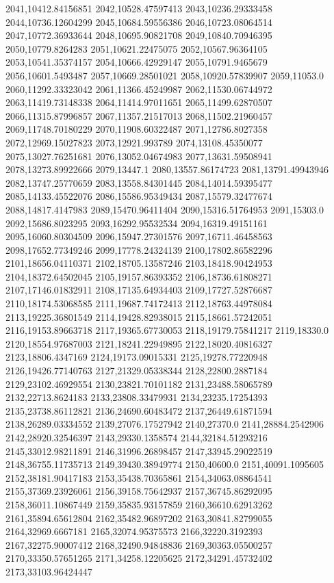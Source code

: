 2041,10412.84156851
2042,10528.47597413
2043,10236.29333458
2044,10736.12604299
2045,10684.59556386
2046,10723.08064514
2047,10772.36933644
2048,10695.90821708
2049,10840.70946395
2050,10779.8264283
2051,10621.22475075
2052,10567.96364105
2053,10541.35374157
2054,10666.42929147
2055,10791.9465679
2056,10601.5493487
2057,10669.28501021
2058,10920.57839907
2059,11053.0
2060,11292.33323042
2061,11366.45249987
2062,11530.06744972
2063,11419.73148338
2064,11414.97011651
2065,11499.62870507
2066,11315.87996857
2067,11357.21517013
2068,11502.21960457
2069,11748.70180229
2070,11908.60322487
2071,12786.8027358
2072,12969.15027823
2073,12921.993789
2074,13108.45350077
2075,13027.76251681
2076,13052.04674983
2077,13631.59508941
2078,13273.89922666
2079,13447.1
2080,13557.86174723
2081,13791.49943946
2082,13747.25770659
2083,13558.84301445
2084,14014.59395477
2085,14133.45522076
2086,15586.95349434
2087,15579.32477674
2088,14817.4147983
2089,15470.96411404
2090,15316.51764953
2091,15303.0
2092,15686.8023295
2093,16292.95532534
2094,16319.49151161
2095,16060.80304509
2096,15947.27301576
2097,16711.46458563
2098,17652.77349246
2099,17778.24324139
2100,17802.86582296
2101,18656.04110371
2102,18705.13587246
2103,18418.90424953
2104,18372.64502045
2105,19157.86393352
2106,18736.61808271
2107,17146.01832911
2108,17135.64934403
2109,17727.52876687
2110,18174.53068585
2111,19687.74172413
2112,18763.44978084
2113,19225.36801549
2114,19428.82938015
2115,18661.57242051
2116,19153.89663718
2117,19365.67730053
2118,19179.75841217
2119,18330.0
2120,18554.97687003
2121,18241.22949895
2122,18020.40816327
2123,18806.4347169
2124,19173.09015331
2125,19278.77220948
2126,19426.77140763
2127,21329.05338344
2128,22800.2887184
2129,23102.46929554
2130,23821.70101182
2131,23488.58065789
2132,22713.8624183
2133,23808.33479931
2134,23235.17254393
2135,23738.86112821
2136,24690.60483472
2137,26449.61871594
2138,26289.03334552
2139,27076.17527942
2140,27370.0
2141,28884.2542906
2142,28920.32546397
2143,29330.1358574
2144,32184.51293216
2145,33012.98211891
2146,31996.26898457
2147,33945.29022519
2148,36755.11735713
2149,39430.38949774
2150,40600.0
2151,40091.1095605
2152,38181.90417183
2153,35438.70365861
2154,34063.08864541
2155,37369.23926061
2156,39158.75642937
2157,36745.86292095
2158,36011.10867449
2159,35835.93157859
2160,36610.62913262
2161,35894.65612804
2162,35482.96897202
2163,30841.82799055
2164,32969.6667181
2165,32074.95375573
2166,32220.3192393
2167,32275.90007412
2168,32490.94848836
2169,30363.05500257
2170,33350.57651265
2171,34258.12205625
2172,34291.45732402
2173,33103.96424447
